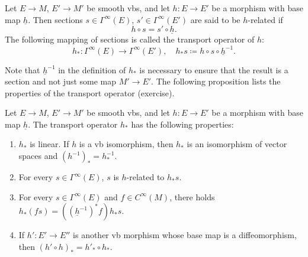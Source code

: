 \begin{defn}
    Let $E\to M$, $E'\to M'$ be smooth \glspl{vb}, and let $h:E\to E'$ be a morphism with base map $\underline{h}$. Then sections $s\in\Gamma^\infty(E)$, $s'\in\Gamma^\infty(E')$ are said to be $h$-related if 
    \[h\circ s=s'\circ \underline{h}.\label{eq def transport op}\]
    The following mapping of sections is called the transport operator of $h$:
    \[h_\ast:\Gamma^\infty(E)\to \Gamma^\infty(E'),\quad h_\ast s\coloneqq h\circ s\circ \underline{h}^{-1}.\]
\end{defn}

Note that $\underline{h}^{-1}$ in the definition of $h_\ast$ is necessary to ensure that the result is a section and not just some map $M'\to E'$. The following proposition lists the properties of the transport operator (exercise).

\begin{prop}[{\cite[Prop.~2.3.7]{RS1}}]
    Let $E\to M$, $E'\to M'$ be smooth \glspl{vb}, and let $h:E\to E'$ be a morphism with base map $\underline{h}$. The transport operator $h_\ast$ has the following properties:
    \begin{enumerate}[label=(\alph*)]
        \item $h_\ast$ is linear. If $h$ is a \gls{vb} isomorphism, then $h_\ast$ is an isomorphism of vector spaces and $\left(h^{-1}\right)_\ast=h_\ast^{-1}$.
        \item For every $s\in \Gamma^\infty(E)$, $s$ is $h$-related to $h_\ast s$.
        \item For every $s\in\Gamma^\infty(E)$ and $f\in C^\infty(M)$, there holds $h_\ast(fs)=\left(\left(\underline{h}^{-1}\right)^\ast f\right)h_\ast s$.
        \item If $h':E'\to E''$ is another \gls{vb} morphism whose base map is a diffeomorphism, then $(h'\circ h)_\ast=h'_\ast\circ h_\ast$.
    \end{enumerate}
\end{prop}

